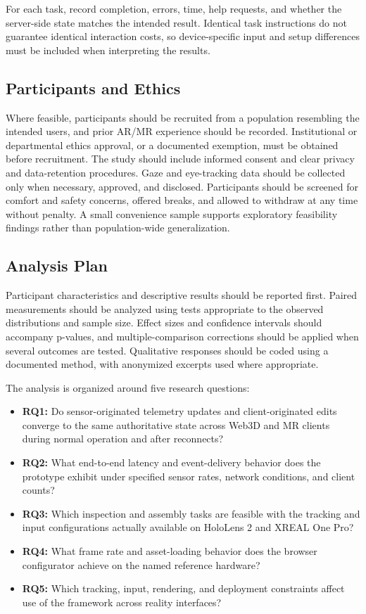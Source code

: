 \documentclass[conference]{IEEEtran}
\begin{document}
For each task, record completion, errors, time, help requests, and whether the server-side state matches the intended result. Identical task instructions do not guarantee identical interaction costs, so device-specific input and setup differences must be included when interpreting the results.

\subsection{Participants and Ethics}
Where feasible, participants should be recruited from a population resembling the intended users, and prior AR/MR experience should be recorded. Institutional or departmental ethics approval, or a documented exemption, must be obtained before recruitment. The study should include informed consent and clear privacy and data-retention procedures. Gaze and eye-tracking data should be collected only when necessary, approved, and disclosed. Participants should be screened for comfort and safety concerns, offered breaks, and allowed to withdraw at any time without penalty. A small convenience sample supports exploratory feasibility findings rather than population-wide generalization.

\subsection{Analysis Plan}
Participant characteristics and descriptive results should be reported first. Paired measurements should be analyzed using tests appropriate to the observed distributions and sample size. Effect sizes and confidence intervals should accompany p-values, and multiple-comparison corrections should be applied when several outcomes are tested. Qualitative responses should be coded using a documented method, with anonymized excerpts used where appropriate.

The analysis is organized around five research questions:
\begin{itemize}
  \item \textbf{RQ1:} Do sensor-originated telemetry updates and client-originated edits converge to the same authoritative state across Web3D and MR clients during normal operation and after reconnects?
  \item \textbf{RQ2:} What end-to-end latency and event-delivery behavior does the prototype exhibit under specified sensor rates, network conditions, and client counts?
  \item \textbf{RQ3:} Which inspection and assembly tasks are feasible with the tracking and input configurations actually available on HoloLens 2 and XREAL One Pro?
  \item \textbf{RQ4:} What frame rate and asset-loading behavior does the browser configurator achieve on the named reference hardware?
  \item \textbf{RQ5:} Which tracking, input, rendering, and deployment constraints affect use of the framework across reality interfaces?
\end{itemize}
\end{document}
